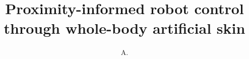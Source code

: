 \documentclass[defaultstyle,11pt]{thesis}
\title{Proximity-informed robot control through whole-body artificial skin}
\author{A.}{Aranburu Fernández}
\begin{document}






% 
% 

\nocite{*}		%


% 
% 
\end{document}
